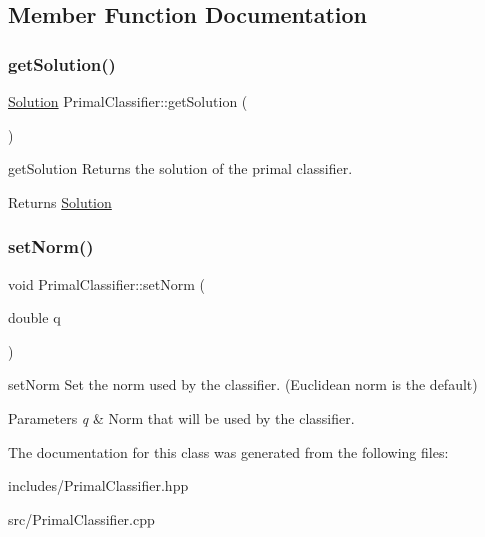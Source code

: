 \subsection{Member Function Documentation}
\mbox{\label{class_primal_classifier_a1a3d9ba4e80c58418db0d8454168b910}} 
\subsubsection{\texorpdfstring{get\+Solution()}{getSolution()}}
{\footnotesize\ttfamily \hyperlink{class_solution}{Solution} Primal\+Classifier\+::get\+Solution (\begin{DoxyParamCaption}{ }\end{DoxyParamCaption})}



get\+Solution Returns the solution of the primal classifier. 

\begin{DoxyReturn}{Returns}
\hyperlink{class_solution}{Solution} 
\end{DoxyReturn}
\mbox{\label{class_primal_classifier_aecd2369094119c294333bc12df419b16}} 
\subsubsection{\texorpdfstring{set\+Norm()}{setNorm()}}
{\footnotesize\ttfamily void Primal\+Classifier\+::set\+Norm (\begin{DoxyParamCaption}\item[{double}]{q }\end{DoxyParamCaption})}



set\+Norm Set the norm used by the classifier. (Euclidean norm is the default) 


\begin{DoxyParams}{Parameters}
{\em q} & Norm that will be used by the classifier. \\
\hline
\end{DoxyParams}


The documentation for this class was generated from the following files\+:\begin{DoxyCompactItemize}
\item 
includes/Primal\+Classifier.\+hpp\item 
src/Primal\+Classifier.\+cpp\end{DoxyCompactItemize}
